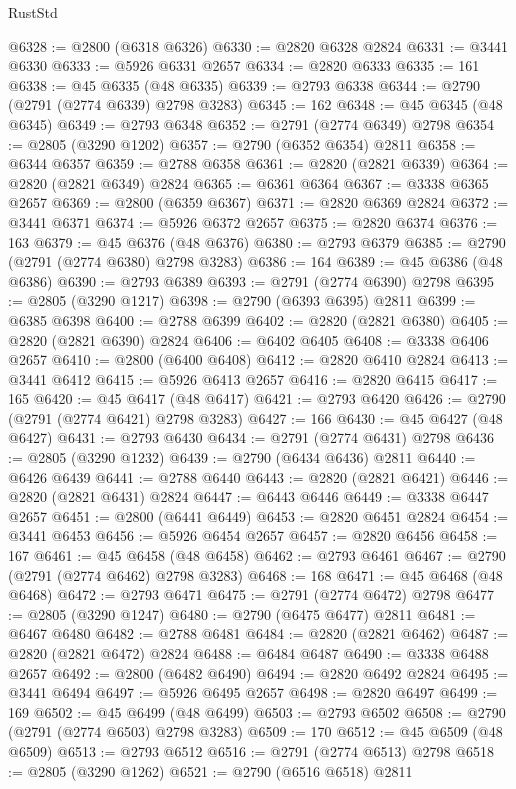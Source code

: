 \begin{lexlean}{RustStd}
\begin{coremodule}
@6328 := @2800 (@6318 @6326)
@6330 := @2820 @6328 @2824
@6331 := @3441 @6330
@6333 := @5926 @6331 @2657
@6334 := @2820 @6333
@6335 := 161
@6338 := @45 @6335 (@48 @6335)
@6339 := @2793 @6338
@6344 := @2790 (@2791 (@2774 @6339) @2798 @3283)
@6345 := 162
@6348 := @45 @6345 (@48 @6345)
@6349 := @2793 @6348
@6352 := @2791 (@2774 @6349) @2798
@6354 := @2805 (@3290 @1202)
@6357 := @2790 (@6352 @6354) @2811
@6358 := @6344 @6357
@6359 := @2788 @6358
@6361 := @2820 (@2821 @6339)
@6364 := @2820 (@2821 @6349) @2824
@6365 := @6361 @6364
@6367 := @3338 @6365 @2657
@6369 := @2800 (@6359 @6367)
@6371 := @2820 @6369 @2824
@6372 := @3441 @6371
@6374 := @5926 @6372 @2657
@6375 := @2820 @6374
@6376 := 163
@6379 := @45 @6376 (@48 @6376)
@6380 := @2793 @6379
@6385 := @2790 (@2791 (@2774 @6380) @2798 @3283)
@6386 := 164
@6389 := @45 @6386 (@48 @6386)
@6390 := @2793 @6389
@6393 := @2791 (@2774 @6390) @2798
@6395 := @2805 (@3290 @1217)
@6398 := @2790 (@6393 @6395) @2811
@6399 := @6385 @6398
@6400 := @2788 @6399
@6402 := @2820 (@2821 @6380)
@6405 := @2820 (@2821 @6390) @2824
@6406 := @6402 @6405
@6408 := @3338 @6406 @2657
@6410 := @2800 (@6400 @6408)
@6412 := @2820 @6410 @2824
@6413 := @3441 @6412
@6415 := @5926 @6413 @2657
@6416 := @2820 @6415
@6417 := 165
@6420 := @45 @6417 (@48 @6417)
@6421 := @2793 @6420
@6426 := @2790 (@2791 (@2774 @6421) @2798 @3283)
@6427 := 166
@6430 := @45 @6427 (@48 @6427)
@6431 := @2793 @6430
@6434 := @2791 (@2774 @6431) @2798
@6436 := @2805 (@3290 @1232)
@6439 := @2790 (@6434 @6436) @2811
@6440 := @6426 @6439
@6441 := @2788 @6440
@6443 := @2820 (@2821 @6421)
@6446 := @2820 (@2821 @6431) @2824
@6447 := @6443 @6446
@6449 := @3338 @6447 @2657
@6451 := @2800 (@6441 @6449)
@6453 := @2820 @6451 @2824
@6454 := @3441 @6453
@6456 := @5926 @6454 @2657
@6457 := @2820 @6456
@6458 := 167
@6461 := @45 @6458 (@48 @6458)
@6462 := @2793 @6461
@6467 := @2790 (@2791 (@2774 @6462) @2798 @3283)
@6468 := 168
@6471 := @45 @6468 (@48 @6468)
@6472 := @2793 @6471
@6475 := @2791 (@2774 @6472) @2798
@6477 := @2805 (@3290 @1247)
@6480 := @2790 (@6475 @6477) @2811
@6481 := @6467 @6480
@6482 := @2788 @6481
@6484 := @2820 (@2821 @6462)
@6487 := @2820 (@2821 @6472) @2824
@6488 := @6484 @6487
@6490 := @3338 @6488 @2657
@6492 := @2800 (@6482 @6490)
@6494 := @2820 @6492 @2824
@6495 := @3441 @6494
@6497 := @5926 @6495 @2657
@6498 := @2820 @6497
@6499 := 169
@6502 := @45 @6499 (@48 @6499)
@6503 := @2793 @6502
@6508 := @2790 (@2791 (@2774 @6503) @2798 @3283)
@6509 := 170
@6512 := @45 @6509 (@48 @6509)
@6513 := @2793 @6512
@6516 := @2791 (@2774 @6513) @2798
@6518 := @2805 (@3290 @1262)
@6521 := @2790 (@6516 @6518) @2811

\end{coremodule}
\end{lexlean}
